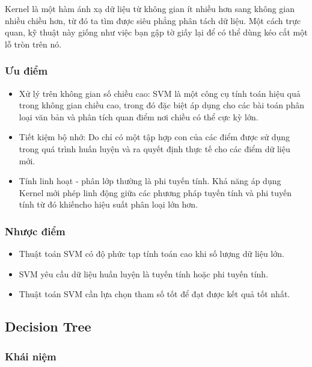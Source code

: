 \documentclass[
]{article}
\providecommand{\tightlist}{%
  \setlength{\itemsep}{0pt}\setlength{\parskip}{0pt}}
\begin{document}
Kernel là một hàm ánh xạ dữ liệu từ không gian ít nhiều hơn sang không
gian nhiều chiều hơn, từ đó ta tìm được siêu phẳng phân tách dữ liệu.
Một cách trực quan, kỹ thuật này giống như việc bạn gập tờ giấy lại để
có thể dùng kéo cắt một lỗ tròn trên nó.

\subsubsection{Ưu điểm}\label{ux1b0u-ux111iux1ec3m-1}

\begin{itemize}
\tightlist
\item
  Xử lý trên không gian số chiều cao: SVM là một công cụ tính toán hiệu
  quả trong không gian chiều cao, trong đó đặc biệt áp dụng cho các bài
  toán phân loại văn bản và phân tích quan điểm nơi chiều có thể cực kỳ
  lớn.
\item
  Tiết kiệm bộ nhớ: Do chỉ có một tập hợp con của các điểm được sử dụng
  trong quá trình huấn luyện và ra quyết định thực tế cho các điểm dữ
  liệu mới.
\item
  Tính linh hoạt - phân lớp thường là phi tuyến tính. Khả năng áp dụng
  Kernel mới phép linh động giữa các phương pháp tuyến tính và phi tuyến
  tính từ đó khiếncho hiệu suất phân loại lớn hơn.
\end{itemize}

\subsubsection{Nhược điểm}\label{nhux1b0ux1ee3c-ux111iux1ec3m-1}

\begin{itemize}
\tightlist
\item
  Thuật toán SVM có độ phức tạp tính toán cao khi số lượng dữ liệu lớn.
\item
  SVM yêu cầu dữ liệu huấn luyện là tuyến tính hoặc phi tuyến tính.
\item
  Thuật toán SVM cần lựa chọn tham số tốt để đạt được kết quả tốt nhất.
\end{itemize}

\subsection{Decision Tree}\label{decision-tree}

\subsubsection{Khái niệm}\label{khuxe1i-niux1ec7m-3}
\end{document}
